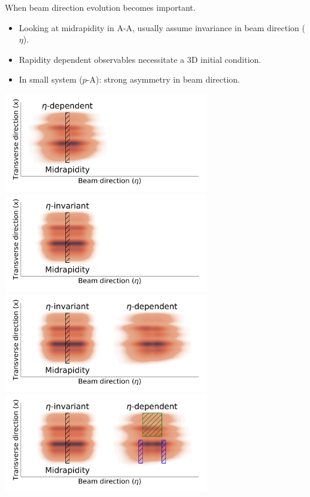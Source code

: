 \documentclass[11pt]{beamer}
\begin{document}
\begin{frame}{When beam direction evolution becomes important.}
\begin{itemize}
\item Looking at midrapidity in A-A, usually assume invariance in beam direction ($\eta$).
\item Rapidity dependent observables necessitate a 3D initial condition.
\item In small system ($p$-A): strong asymmetry in beam direction.
\end{itemize}

\begin{overprint}
\includegraphics[width=0.67\textwidth]{nuclei_demo_a.pdf}
\includegraphics[width=0.67\textwidth]{nuclei_demo_b.pdf}
\includegraphics[width=0.67\textwidth]{nuclei_demo_01.pdf}
\includegraphics[width=0.67\textwidth]{nuclei_demo_02.pdf}

\end{overprint}
\end{frame}
\end{document}
